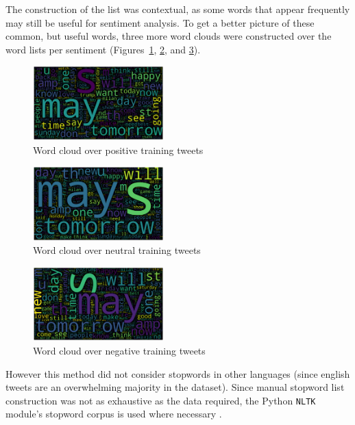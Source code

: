 \documentclass[11pt]{article}
\begin{document}
The construction of the list was contextual, as some words that appear frequently may still be useful for sentiment analysis.
To get a better picture of these common, but useful words, three more word clouds were constructed over the word lists per sentiment (Figures~\ref{fig:wc-pos}, \ref{fig:wc-neu}, and \ref{fig:wc-neg}).

\begin{figure}[!h]
	\centering
	\includegraphics[width = 0.45\textwidth]{wc-positive-clean-default.png}
	\caption{Word cloud over positive training tweets}
	\label{fig:wc-pos}
\end{figure} 

\begin{figure}[!h]
	\centering
	\includegraphics[width = 0.45\textwidth]{wc-neutral-clean-default.png}
	\caption{Word cloud over neutral training tweets}
	\label{fig:wc-neu}
\end{figure} 

\begin{figure}[!h]
	\centering
	\includegraphics[width = 0.45\textwidth]{wc-negative-clean-default.png}
	\caption{Word cloud over negative training tweets}
	\label{fig:wc-neg}
\end{figure} 

However this method did not consider stopwords in other languages (since english tweets are an overwhelming majority in the dataset).
Since manual stopword list construction was not as exhaustive as the data required,
the {P}ython \texttt{NLTK} module's stopword corpus is used where necessary \cite{nltk}.
\end{document}

